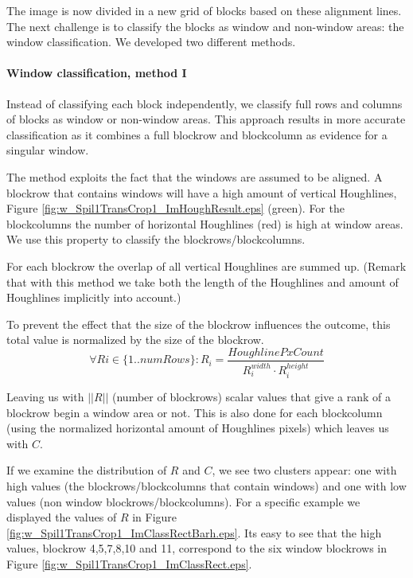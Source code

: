
The image is now divided in a new grid of blocks based on these
alignment lines. The next challenge is to classify the blocks as window and
non-window areas: the window classification. We developed two different methods.


\paragraph{Window classification, method I}
Instead of classifying each block independently, we classify full rows and
columns of blocks as window or non-window areas.  This approach results in more accurate
classification as it combines a full blockrow and blockcolumn as evidence for a singular
window. 

The method exploits the fact that the windows are assumed to be
aligned.
A blockrow that contains windows will have a high amount of vertical
Houghlines, Figure \ref{fig:w_Spil1TransCrop1_ImHoughResult.eps}
(green). For the blockcolumns the number of horizontal Houghlines
 (red) is high at window areas.  We use this property to classify 
 the blockrows/blockcolumns. 

For each blockrow the overlap of all vertical Houghlines are summed up.
(Remark that with this method we take both the length of the Houghlines and
amount of Houghlines implicitly into account.)

To prevent the effect that the size of the blockrow influences the outcome, this total value
is normalized by the size of the blockrow.
\[\forall Ri\in \{1..numRows\} : R_i = \frac{HoughlinePxCount}{R_i^{width} \cdot R_i^{height}}\]

Leaving us with $||R||$ (number of blockrows) scalar values that give a rank of a blockrow begin a window area or not.
This is also done for each blockcolumn (using the normalized horizontal amount of
Houghlines pixels) which leaves us with $C$.

If we examine the distribution of $R$ and $C$, we see two clusters appear: one with
high values (the blockrows/blockcolumns that contain windows) and one with low values (non window
blockrows/blockcolumns). For a specific example we displayed the values of $R$ in Figure \ref{fig:w_Spil1TransCrop1_ImClassRectBarh.eps}.
Its easy to see that the high values, blockrow 4,5,7,8,10 and 11, correspond to the
six window blockrows in Figure \ref{fig:w_Spil1TransCrop1_ImClassRect.eps}.

